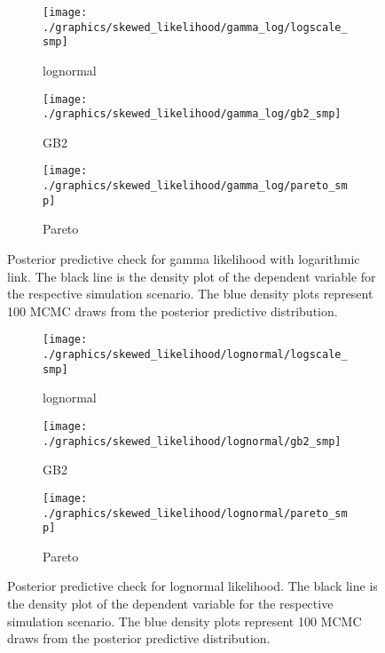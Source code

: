 \begin{figure}[t]
    \centering
    \begin{subfigure}{0.29\textwidth}
        \texttt{[image: ./graphics/skewed\_likelihood/gamma\_log/logscale\_smp]}
        \caption{lognormal}
    \end{subfigure}
    \begin{subfigure}{0.29\textwidth}
        \texttt{[image: ./graphics/skewed\_likelihood/gamma\_log/gb2\_smp]}
        \caption{GB2}
    \end{subfigure}
    \begin{subfigure}{0.29\textwidth}
        \texttt{[image: ./graphics/skewed\_likelihood/gamma\_log/pareto\_smp]}
        \caption{Pareto}
    \end{subfigure}
    \label{fig:gamma_ppc}
    \caption[Posterior predictive check for gamma likelihood]{Posterior predictive check for gamma likelihood with logarithmic link. The black line is the density plot of the dependent variable for the respective simulation scenario. The blue density plots represent 100 MCMC draws from the posterior predictive distribution.}
\end{figure}

\begin{figure}[h]
    \centering
    \begin{subfigure}{0.29\textwidth}
        \texttt{[image: ./graphics/skewed\_likelihood/lognormal/logscale\_smp]}
        \caption{lognormal}
    \end{subfigure}
    \begin{subfigure}{0.29\textwidth}
        \texttt{[image: ./graphics/skewed\_likelihood/lognormal/gb2\_smp]}
        \caption{GB2}
    \end{subfigure}
    \begin{subfigure}{0.29\textwidth}
        \texttt{[image: ./graphics/skewed\_likelihood/lognormal/pareto\_smp]}
        \caption{Pareto}
    \end{subfigure}
    \label{fig:lognormal_ppc}
    \caption[Posterior predictive check for lognormal likelihood]{Posterior predictive check for lognormal likelihood. The black line is the density plot of the dependent variable for the respective simulation scenario. The blue density plots represent 100 MCMC draws from the posterior predictive distribution.}
\end{figure}


